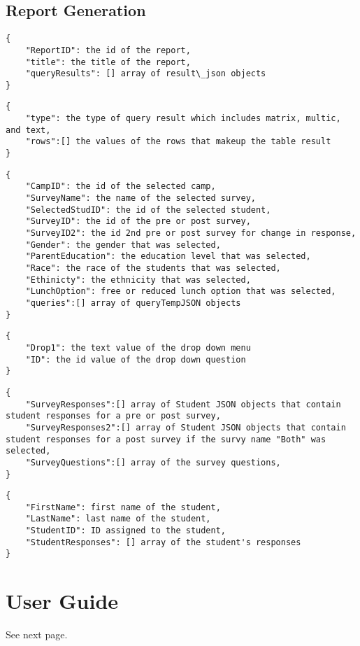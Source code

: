 \documentclass[../final.tex]{subfiles}
\begin{document}
\subsection{Report Generation}
\begin{lstlisting}[caption={report\_json }]
{
	"ReportID": the id of the report,
	"title": the title of the report,
	"queryResults": [] array of result\_json objects
}
\end{lstlisting}


\begin{lstlisting}[caption={result\_json}]
{
	"type": the type of query result which includes matrix, multic, and text,
	"rows":[] the values of the rows that makeup the table result
}
\end{lstlisting}


\begin{lstlisting}[caption={queryJSON}]
{
	"CampID": the id of the selected camp,
	"SurveyName": the name of the selected survey,
	"SelectedStudID": the id of the selected student,
	"SurveyID": the id of the pre or post survey,
	"SurveyID2": the id 2nd pre or post survey for change in response,
	"Gender": the gender that was selected,
	"ParentEducation": the education level that was selected,
	"Race": the race of the students that was selected,
	"Ethinicty": the ethnicity that was selected,
	"LunchOption": free or reduced lunch option that was selected,
	"queries":[] array of queryTempJSON objects
}
\end{lstlisting}

	
\begin{lstlisting}[caption={queryTempJSON}]
{
	"Drop1": the text value of the drop down menu
	"ID": the id value of the drop down question 
}
\end{lstlisting}

\begin{lstlisting}[caption={JSON Object Returned by ReportQuerying.php}]
{
	"SurveyResponses":[] array of Student JSON objects that contain student responses for a pre or post survey,
	"SurveyResponses2":[] array of Student JSON objects that contain student responses for a post survey if the survy name "Both" was selected,
	"SurveyQuestions":[] array of the survey questions,
}
\end{lstlisting}

\begin{lstlisting}[caption={Student JSON Object Used in ReportQuerying.php}]
{
	"FirstName": first name of the student,
	"LastName": last name of the student,
	"StudentID": ID assigned to the student,
	"StudentResponses": [] array of the student's responses
}

\end{lstlisting}
\section{User Guide}
See next page. \\

\end{document}
